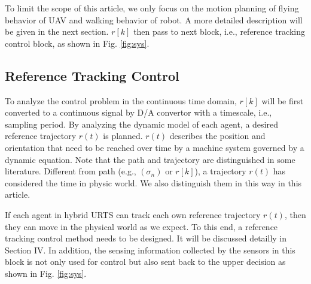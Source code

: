 \documentclass{ieeeaccess}
\begin{document}
To limit the scope of this article, we only focus on the motion planning of flying behavior of UAV and walking behavior of robot. A more detailed description will be given in the next section. $r[k]$ then pass to next block, i.e., reference tracking control block, as shown in Fig. \ref{fig:sys}.

\subsection{Reference Tracking Control}
To analyze the control problem in the continuous time domain, $r[k]$ will be first converted to a continuous signal by D/A convertor with a timescale, i.e., sampling period. By analyzing the dynamic model of each agent, a desired reference trajectory $r(t)$ is planned. $r(t)$ describes the position and orientation that need to be reached over time by a machine system governed by a dynamic equation. Note that the path and trajectory are distinguished in some literature. Different from path (e.g., $(\sigma_n)$ or $r[k]$), a trajectory $r(t)$ has considered the time in physic world. We also distinguish them in this way in this article.

If each agent in hybrid URTS can track each own reference trajectory $r(t)$, then they can move in the physical world as we expect. To this end, a reference tracking control method needs to be designed. It will be discussed detailly in Section IV. In addition, the sensing information collected by the sensors in this block is not only used for control but also sent back to the upper decision as shown in Fig. \ref{fig:sys}.
\end{document}
